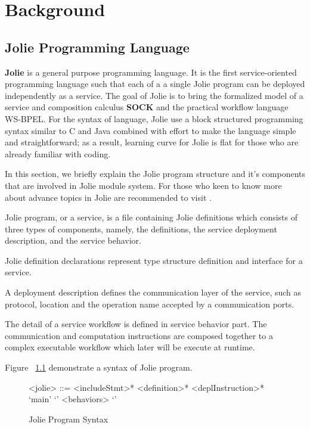 \chapter{Background}

\section{Jolie Programming Language}

\textbf{Jolie}\cite{JOLIE} is a general purpose programming language.
It is the first service-oriented programming language such that each of a a single Jolie program can be deployed independently as a service.
The goal of Jolie is to bring the formalized model of a service and composition calculus \textbf{SOCK} \cite{10.1007/11948148-27} and the practical workflow language WS-BPEL\cite{OASIS}.
For the syntax of language, Jolie use a block structured programming syntax similar to C and Java combined with effort to make the language simple and straightforward; as a result, learning curve for Jolie is flat for those who are already familiar with coding.

In this section, we briefly explain the Jolie program structure and it's components that are involved in Jolie module system. For those who keen to know more about advance topics in Jolie are recommended to visit \cite{joliedoc, JOLIE}.

Jolie program, or a service, is a file containing Jolie definitions which consists of three types of components, namely, the definitions, the service deployment description, and the service behavior.

Jolie definition declarations represent type structure definition and interface for a service.

A deployment description defines the communication layer of the service, such as protocol, location and the operation name accepted by a communication ports.

The detail of a service workflow is defined in service behavior part. The communication and computation instructions are composed together to a complex executable workflow which later will be execute at runtime.

Figure ~\ref{fig:JolieGrammar} demonstrate a syntax of Jolie program.

\begin{figure}[h]
    \begin{framed}
        \begin{grammar}
            <jolie> ::= <includeStmt>* <definition>* <deplInstruction>*  `main' `{' <behaviors> `}'
        \end{grammar}
    \end{framed}
    \caption{Jolie Program Syntax}
    \label{fig:JolieGrammar}
\end{figure}

